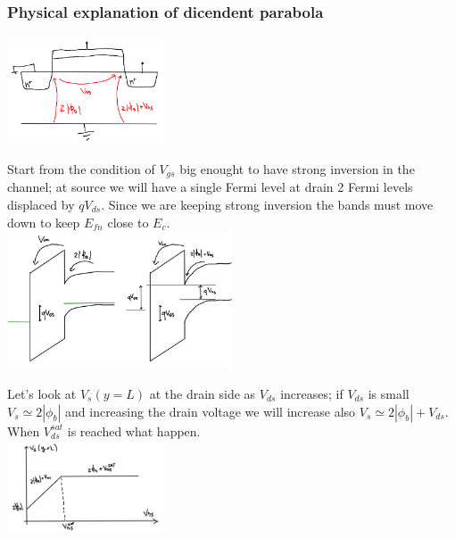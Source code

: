 \subsubsection{Physical explanation of dicendent parabola}


\centering
\includegraphics[width=0.35\textwidth]{f1.png}\\
\raggedright

Start from the condition of $V_{gs}$ big enought to have strong inversion in the channel; at source we will have a single Fermi level at drain 2 Fermi levels displaced by $qV_{ds}$. Since we are keeping strong inversion the bands must move down to keep $E_{fn}$ close to $E_c$.\\

\centering
\includegraphics[width=0.5\textwidth]{f2.png}\\
\raggedright


Let's look at $V_s(y=L)$ at the drain side as $V_{ds}$ increases; if $V_{ds}$ is small $V_s\simeq 2|\phi_b|$ and increasing the drain voltage we will increase also $V_s\simeq 2|\phi_b|+V_{ds}$. When $V_{ds}^{sat}$ is reached what happen.\\


\centering
\includegraphics[width=0.35\textwidth]{f3.png}\\
\raggedright


